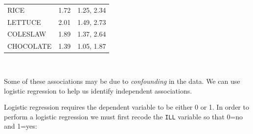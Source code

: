 \documentclass[12pt,a4paper]{book}
\newenvironment{Shaded}{\begin{snugshade}}{\end{snugshade}}
\newcommand{\KeywordTok}[1]{\textcolor[rgb]{0.13,0.29,0.53}{\textbf{#1}}}
\newcommand{\DecValTok}[1]{\textcolor[rgb]{0.00,0.00,0.81}{#1}}
\newcommand{\StringTok}[1]{\textcolor[rgb]{0.31,0.60,0.02}{#1}}
\newcommand{\OperatorTok}[1]{\textcolor[rgb]{0.81,0.36,0.00}{\textbf{#1}}}
\newcommand{\NormalTok}[1]{#1}
\theoremstyle{definition}
\theoremstyle{definition}
\theoremstyle{definition}
\theoremstyle{remark}
\begin{document}
\begin{longtable}[]{@{}lll@{}}
\begin{minipage}[t]{0.20\columnwidth}
RICE\strut
\end{minipage} & \begin{minipage}[t]{0.14\columnwidth}\raggedright
1.72\strut
\end{minipage} & \begin{minipage}[t]{0.27\columnwidth}\raggedright
1.25, 2.34\strut
\end{minipage}\tabularnewline
\begin{minipage}[t]{0.20\columnwidth}\raggedright
LETTUCE\strut
\end{minipage} & \begin{minipage}[t]{0.14\columnwidth}\raggedright
2.01\strut
\end{minipage} & \begin{minipage}[t]{0.27\columnwidth}\raggedright
1.49, 2.73\strut
\end{minipage}\tabularnewline
\begin{minipage}[t]{0.20\columnwidth}\raggedright
COLESLAW\strut
\end{minipage} & \begin{minipage}[t]{0.14\columnwidth}\raggedright
1.89\strut
\end{minipage} & \begin{minipage}[t]{0.27\columnwidth}\raggedright
1.37, 2.64\strut
\end{minipage}\tabularnewline
\begin{minipage}[t]{0.20\columnwidth}\raggedright
CHOCOLATE\strut
\end{minipage} & \begin{minipage}[t]{0.14\columnwidth}\raggedright
1.39\strut
\end{minipage} & \begin{minipage}[t]{0.27\columnwidth}\raggedright
1.05, 1.87\strut
\end{minipage}\tabularnewline
\bottomrule
\end{longtable}

~

Some of these associations may be due to \emph{confounding} in the data.
We can use logistic regression to help us identify independent
associations.

Logistic regression requires the dependent variable to be either 0 or 1.
In order to perform a logistic regression we must first recode the
\texttt{ILL} variable so that 0=no and 1=yes:

~

\begin{Shaded}
\end{Shaded}
\end{document}
